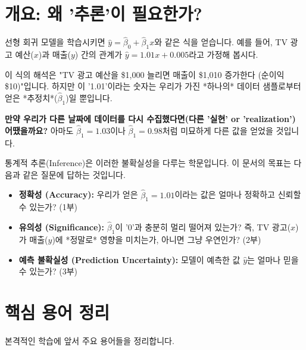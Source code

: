 \documentclass[11pt,a4paper]{book}
\theoremstyle{definition}
\begin{document}
\section{개요: 왜 '추론'이 필요한가?}

선형 회귀 모델을 학습시키면 $\hat{y} = \hat{\beta}_0 + \hat{\beta}_1 x$와 같은 식을 얻습니다. 예를 들어, TV 광고 예산($x$)과 매출($y$) 간의 관계가 $\hat{y} = 1.01x + 0.005$라고 가정해 봅시다.

이 식의 해석은 "TV 광고 예산을 \$1,000 늘리면 매출이 \$1,010 증가한다 (순이익 \$10)"입니다. 하지만 이 '1.01'이라는 숫자는 우리가 가진 *하나의* 데이터 샘플로부터 얻은 *추정치*($\hat{\beta}_1$)일 뿐입니다.

\textbf{만약 우리가 다른 날짜에 데이터를 다시 수집했다면(다른 '실현' or 'realization') 어땠을까요?}
아마도 $\hat{\beta}_1 = 1.03$이나 $\hat{\beta}_1 = 0.98$처럼 미묘하게 다른 값을 얻었을 것입니다.

통계적 추론(Inference)은 이러한 불확실성을 다루는 학문입니다. 이 문서의 목표는 다음과 같은 질문에 답하는 것입니다.

\begin{itemize}
    \item \textbf{정확성 (Accuracy):} 우리가 얻은 $\hat{\beta}_1 = 1.01$이라는 값은 얼마나 정확하고 신뢰할 수 있는가? (1부)
    \item \textbf{유의성 (Significance):} $\hat{\beta}_1$이 '0'과 충분히 멀리 떨어져 있는가? 즉, TV 광고($x$)가 매출($y$)에 *정말로* 영향을 미치는가, 아니면 그냥 우연인가? (2부)
    \item \textbf{예측 불확실성 (Prediction Uncertainty):} 모델이 예측한 값 $\hat{y}$는 얼마나 믿을 수 있는가? (3부)
\end{itemize}


\section{핵심 용어 정리}

본격적인 학습에 앞서 주요 용어들을 정리합니다.
\end{document}
